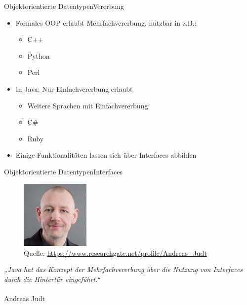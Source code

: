 \begin{frame}{Objektorientierte Datentypen}{Vererbung}
	\begin{itemize}
		\item Formales OOP erlaubt Mehrfachvererbung, nutzbar in z.B.:
		\begin{itemize}
			\item C++
			\item Python
			\item Perl
		\end{itemize}
		\item In Java: Nur Einfachvererbung erlaubt
		\begin{itemize}
			\item Weitere Sprachen mit Einfachvererbung:
			\item C\#
			\item Ruby
		\end{itemize}
		\item Einige Funktionalitäten lassen sich über Interfaces abbilden
	\end{itemize}
\end{frame}

\begin{frame}{Objektorientierte Datentypen}{Interfaces}
	\begin{minipage}{0.4\textwidth}
			\begin{figure}
				\includegraphics[height=3.35cm]{graph/judt}
				\caption*{Quelle: \url{https://www.researchgate.net/profile/Andreas_Judt}}
				\label{fig:ll}
			\end{figure}
		\end{minipage}
		\hfill
		\begin{minipage}{0.55\textwidth}
			\textit{„Java hat das Konzept der Mehrfachvererbung über die Nutzung von Interfaces durch die Hintertür eingeführt.“} \\\\Andreas Judt
		\end{minipage}
\end{frame}

